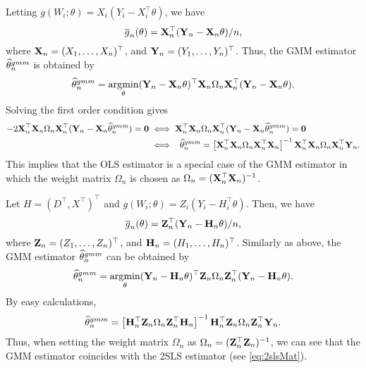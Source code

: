 \documentclass[11pt, A4paper, openany, uplatex]{book}
\begin{document}
\begin{example}\upshape
	Letting $g(W_i; \theta) = X_i( Y_i - X_i^\top\theta)$, we have
	\[
	\overline{g}_n(\theta) = \mathbf{X}_n^\top (\mathbf{Y}_n - \mathbf{X}_n \theta)/n,
	\]
	where $\mathbf{X}_n = (X_1, \ldots , X_n)^\top$, and $\mathbf{Y}_n = (Y_1, \ldots , Y_n)^\top$.
	Thus, the GMM estimator $\widehat \theta_n^{gmm}$ is obtained by
	\begin{align*}
		\widehat{\theta}_n^{gmm} = \operatorname*{\arg\!\min}_{\theta} (\mathbf{Y}_n - \mathbf{X}_n \theta)^\top \mathbf{X}_n \Omega_n \mathbf{X}_n^\top (\mathbf{Y}_n - \mathbf{X}_n \theta).
	\end{align*} 
	Solving the first order condition gives
	\begin{align*}
		- 2\mathbf{X}_n^\top \mathbf{X}_n \Omega_n \mathbf{X}_n^\top (\mathbf{Y}_n - \mathbf{X}_n \widehat \theta_n^{gmm}) = \mathbf{0} 
		& \iff \mathbf{X}_n^\top \mathbf{X}_n \Omega_n \mathbf{X}_n^\top (\mathbf{Y}_n - \mathbf{X}_n \widehat \theta_n^{gmm}) = \mathbf{0} \\
		& \iff \;\; \widehat \theta_n^{gmm} = \left[\mathbf{X}_n^\top \mathbf{X}_n \Omega_n \mathbf{X}_n^\top\mathbf{X}_n \right]^{-1} \mathbf{X}_n^\top \mathbf{X}_n \Omega_n \mathbf{X}_n^\top\mathbf{Y}_n.
	\end{align*}
	This implies that the OLS estimator is a special case of the GMM estimator in which the weight matrix $\Omega_n$ is chosen as $\Omega_n = (\mathbf{X}_n^\top \mathbf{X}_n)^{-1}$.
\end{example}

\begin{example}\upshape
	Let $H = (D^\top, X^\top)^\top$ and $g(W_i; \theta) = Z_i (Y_i - H_i^\top\theta)$.
	Then, we have
	\[
	\overline{g}_n(\theta) = \mathbf{Z}_n^\top (\mathbf{Y}_n - \mathbf{H}_n \theta)/n,
	\]
	where $\mathbf{Z}_n = (Z_1, \ldots, Z_n)^\top$, and $\mathbf{H}_n = (H_1, \ldots , H_n)^\top$.
	Similarly as above, the GMM estimator $\widehat \theta_n^{gmm}$ can be obtained by
	\begin{align*}
		\widehat{\theta}_n^{gmm} = \operatorname*{\arg\!\min}_{\theta} (\mathbf{Y}_n - \mathbf{H}_n \theta)^\top \mathbf{Z}_n \Omega_n \mathbf{Z}_n^\top (\mathbf{Y}_n - \mathbf{H}_n \theta).
	\end{align*}
	By easy calculations,
	\[
	\widehat \theta_n^{gmm} = \left[\mathbf{H}_n^\top \mathbf{Z}_n \Omega_n \mathbf{Z}_n^\top\mathbf{H}_n \right]^{-1} \mathbf{H}_n^\top \mathbf{Z}_n \Omega_n \mathbf{Z}_n^\top\mathbf{Y}_n.
	\]
	Thus, when setting the weight matrix $\Omega_n$ as $\Omega_n = (\mathbf{Z}_n^\top \mathbf{Z}_n)^{-1}$, we can see that  the GMM estimator coincides with the 2SLS estimator (see \eqref{eq:2slsMat}).
\end{example}
\end{document}
